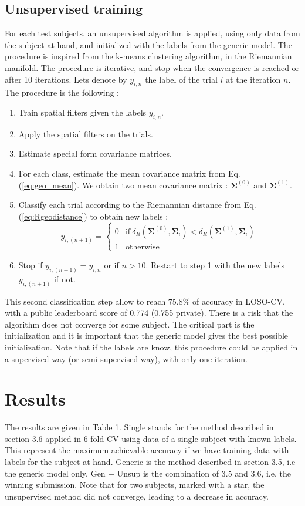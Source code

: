 \documentclass[11pt,a4paper]{article}
\begin{document}
\subsection{Unsupervised training}
For each test subjects, an unsupervised algorithm is applied, using only data from the subject at hand, and initialized with the labels from the generic model. The procedure is inspired from the k-means clustering algorithm, in the Riemannian manifold. The procedure is iterative, and stop when the convergence is reached or after 10 iterations.
Lets denote by $y_{i,n}$ the label of the trial $i$ at the iteration $n$. The procedure is the following :
\begin{enumerate}
\item Train spatial filters given the labels $y_{i,n}$.
\item Apply the spatial filters on the trials.
\item Estimate special form covariance matrices.
\item For each class, estimate the mean covariance matrix from Eq.(\ref{eq:geo_mean}). We obtain two mean covariance matrix : $\mathbf{\Sigma}^{(0)}$ and $\mathbf{\Sigma}^{(1)}$.
\item Classify each trial according to the Riemannian distance from Eq.(\ref{eq:Rgeodistance}) to obtain new labels : 
\begin{equation}
 	 y_{i,(n+1)} = \left\{ \begin{array}{rl}
0 & \text{if} \:  \delta_R(\mathbf{\Sigma}^{(0)},\mathbf{\Sigma}_i) < \delta_R(\mathbf{\Sigma}^{(1)},\mathbf{\Sigma}_i)\\
1 & \text{otherwise}
\end{array} \right.
\end{equation} 
\item Stop if $y_{i,(n+1)}= y_{i,n}$ or if $n>10$. Restart to step 1 with the new labels $y_{i,(n+1)}$ if not.
\end{enumerate}

This second classification step allow to reach 75.8\% of accuracy in LOSO-CV, with a public leaderboard score of 0.774 (0.755 private). There is a risk that the algorithm does not converge for some subject. The critical part is the initialization and it is important that the generic model gives the best possible initialization.
Note that if the labels are know, this procedure could be applied in a supervised way (or semi-supervised way), with only one iteration.

\section{Results}
The results are given in Table 1. Single stands for the method described in section 3.6 applied in 6-fold CV using data of a single subject with known labels. This represent the maximum achievable accuracy if we have training data with labels for the subject at hand. Generic is the method described in section 3.5, i.e the generic model only. Gen + Unsup is the combination of 3.5 and 3.6, i.e. the winning submission. Note that for two subjects, marked with a star, the unsupervised method did not converge, leading to a decrease in accuracy.
\end{document}

